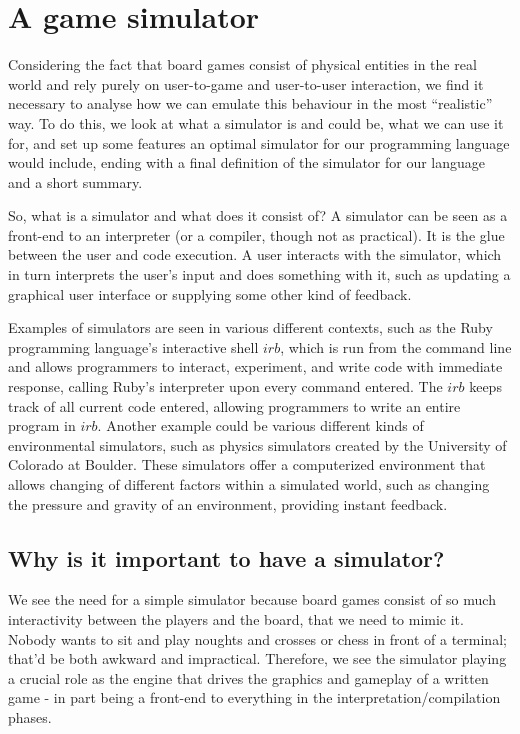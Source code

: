 \section{A game simulator}
\label{sec:simulator}
Considering the fact that board games consist of physical entities in the real
world and rely purely on user-to-game and user-to-user interaction, we find it
necessary to analyse how we can emulate this behaviour in the most ``realistic''
way. To do this, we look at what a simulator is and could be, what we can use it
for, and set up some features an optimal simulator for our programming language
would include, ending with a final definition of the simulator for our language
and a short summary.

So, what is a simulator and what does it consist of? A simulator can be seen as a
front-end to an interpreter (or a compiler, though not as practical). It is the
glue between the user and code execution. A user interacts with the simulator,
which in turn interprets the user's input and does something with it, such as
updating a graphical user interface or supplying some other kind of feedback.

Examples of simulators are seen in various different contexts, such as the
Ruby programming language's interactive shell $irb$, \cite{rubyLang} which is run
from the command line and allows programmers to interact, experiment, and write
code with immediate response, calling Ruby's interpreter upon every command
entered. The $irb$ keeps track of all current code entered, allowing programmers
to write an entire program in $irb$. Another example could be various different
kinds of environmental simulators, such as physics simulators created by the
University of Colorado at Boulder. \cite{colSim} These simulators offer a
computerized environment that allows changing of different factors within a
simulated world, such as changing the pressure and gravity of an environment,
providing instant feedback.

\subsection{Why is it important to have a simulator?}
We see the need for a simple simulator because board games consist of so much
interactivity between the players and the board, that we need to mimic it.
Nobody wants to sit and play noughts and crosses or chess in front of a
terminal; that'd be both awkward and impractical. Therefore, we see the
simulator playing a crucial role as the engine that drives the graphics and
gameplay of a written game - in part being a front-end to everything in the
interpretation/compilation phases.

